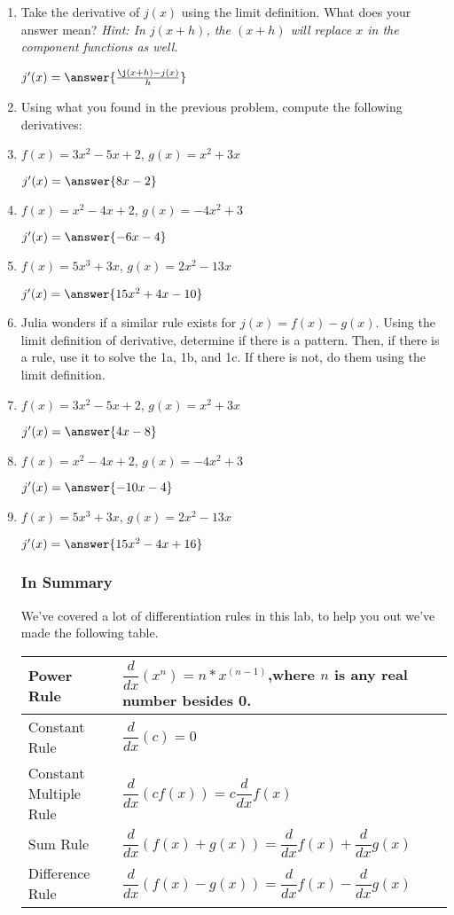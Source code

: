 \documentclass{ximera}
\begin{document}
\begin{enumerate}
\item{Take the derivative of $j(x)$ using the limit definition. What does your answer mean? \textit{Hint: In $j(x+h)$, the $(x+h)$ will replace $x$ in the component functions as well.}}

$ j'(x) =  \answer{\frac{\j(x+h)-j(x)}{h}}$
\item{Using what you found in the previous problem, compute the following derivatives:}
\item{$f(x) = 3x^2 - 5x + 2$, $g(x) = x^2 + 3x$}

$ j'(x) =  \answer{8x-2}$
\item{$f(x) = x^2 - 4x + 2$, $g(x) = -4x^2 + 3$}

$ j'(x) =  \answer{-6x-4}$
\item{$f(x) = 5x^3 + 3x$, $g(x) = 2x^2 - 13x$}

$ j'(x) =  \answer{15x^2+4x-10}$


\item{Julia wonders if a similar rule exists for $j(x) = f(x)-g(x)$. Using the limit definition of derivative, determine if there is a pattern. Then, if there is a rule, use it to solve the 1a, 1b, and 1c. If there is not, do them using the limit definition.}
\item{$f(x) = 3x^2 - 5x + 2$, $g(x) = x^2 + 3x$}

$ j'(x) =  \answer{4x-8}$
\item{$f(x) = x^2 - 4x + 2$, $g(x) = -4x^2 + 3$}

$ j'(x) =  \answer{-10x-4}$
\item{$f(x) = 5x^3 + 3x$, $g(x) = 2x^2 - 13x$}

$ j'(x) =  \answer{15x^2-4x+16}$

\subsubsection{In Summary}
We've covered a lot of differentiation rules in this lab, to help you out we've made the following table.
\begin{center}
\renewcommand{\arraystretch}{3}
\begin{tabular}{| l | p{7.5cm} |}
    \hline
    Power Rule & $\displaystyle \dfrac{d}{dx}(x^n)=n*x^{(n-1)}$,where $n$ is any real number besides 0. \\
    \hline
    Constant Rule & $\displaystyle\dfrac{d}{dx}(c) = 0$ \\
    \hline
    Constant Multiple Rule & $\displaystyle\dfrac{d}{dx}(cf(x))=c\dfrac{d}{dx}f(x)$ \\
    \hline
    Sum Rule & $\displaystyle\dfrac{d}{dx}(f(x)+g(x))=\dfrac{d}{dx}f(x)+\dfrac{d}{dx}g(x)$ \\
    \hline
    Difference Rule & $\displaystyle\dfrac{d}{dx}(f(x)-g(x))=\dfrac{d}{dx}f(x)-\dfrac{d}{dx}g(x)$ \\
    \hline
\end{tabular}
\end{center}

\end{enumerate}
\pagebreak
\end{document}
